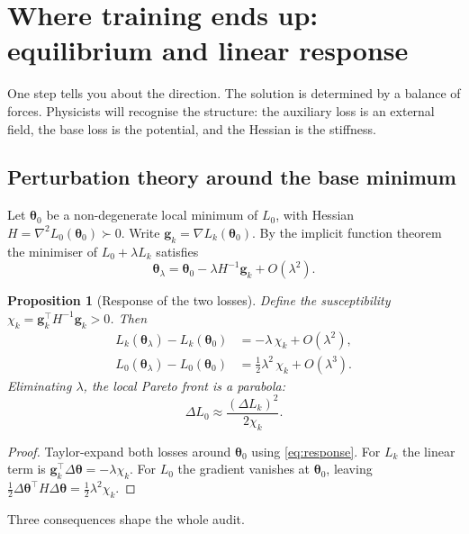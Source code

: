 \documentclass[11pt,a4paper]{article}
\newtheorem{proposition}{Proposition}
\theoremstyle{definition}
\theoremstyle{remark}
\newcommand{\g}{\bm{g}}
\newcommand{\btheta}{\bm{\theta}}
\begin{document}
\section{Where training ends up: equilibrium and linear response}\label{sec:equilibrium}

One step tells you about the direction. The solution is determined by a balance of forces.
Physicists will recognise the structure: the auxiliary loss is an external field, the base
loss is the potential, and the Hessian is the stiffness.

\subsection{Perturbation theory around the base minimum}

Let $\btheta_0$ be a non-degenerate local minimum of $L_0$, with Hessian
$H=\nabla^2L_0(\btheta_0)\succ0$. Write $\g_k=\nabla L_k(\btheta_0)$. By the implicit function
theorem the minimiser of $L_0+\lambda L_k$ satisfies
\begin{equation}\label{eq:response}
  \btheta_\lambda = \btheta_0 - \lambda H^{-1}\g_k + O(\lambda^2).
\end{equation}

\begin{proposition}[Response of the two losses]\label{prop:response}
Define the \emph{susceptibility} $\chi_k = \g_k^\top H^{-1}\g_k > 0$. Then
\begin{align}
  L_k(\btheta_\lambda)-L_k(\btheta_0) &= -\lambda\,\chi_k + O(\lambda^2), \label{eq:lin}\\
  L_0(\btheta_\lambda)-L_0(\btheta_0) &= \tfrac12\lambda^2\,\chi_k + O(\lambda^3). \label{eq:quad}
\end{align}
Eliminating $\lambda$, the local Pareto front is a parabola:
\begin{equation}\label{eq:pareto}
  \Delta L_0 \approx \frac{(\Delta L_k)^2}{2\chi_k}.
\end{equation}
\end{proposition}
\begin{proof}
Taylor-expand both losses around $\btheta_0$ using \eqref{eq:response}. For $L_k$ the linear
term is $\g_k^\top\Delta\btheta = -\lambda\chi_k$. For $L_0$ the gradient vanishes at
$\btheta_0$, leaving $\tfrac12\Delta\btheta^\top H\Delta\btheta=\tfrac12\lambda^2\chi_k$.
\end{proof}

Three consequences shape the whole audit.
\end{document}
